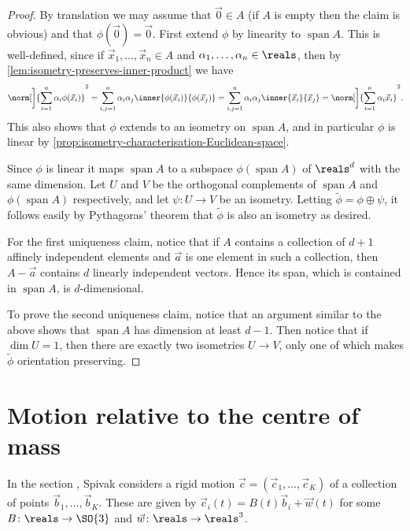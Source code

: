 \documentclass[article, a4paper, 11pt, oneside]{memoir}
\numberwithin{equation}{chapter}
\begin{document}
\newcommand{\Span}{\operatorname{span}}

\begin{proof}
    By translation we may assume that $\vec{0} \in A$ (if $A$ is empty then the claim is obvious) and that $\phi(\vec{0}) = \vec{0}$. First extend $\phi$ by linearity to $\Span A$. This is well-defined, since if $\vec{x}_1, \ldots, \vec{x}_n \in A$ and $\alpha_1, \ldots, \alpha_n \in \reals$, then by \cref{lem:isometry-preserves-inner-product} we have
    \begin{equation*}
        \norm[\bigg]{ \sum_{i=1}^n \alpha_i \phi(\vec{x}_i) }^2
            = \sum_{i,j=1}^n \alpha_i \alpha_j \inner{\phi(\vec{x}_i)}{\phi(\vec{x}_j)}
            = \sum_{i,j=1}^n \alpha_i \alpha_j \inner{\vec{x}_i}{\vec{x}_j}
            = \norm[\bigg]{ \sum_{i=1}^n \alpha_i \vec{x}_i }^2.
    \end{equation*}
    This also shows that $\phi$ extends to an isometry on $\Span A$, and in particular $\phi$ is linear by \cref{prop:isometry-characterisation-Euclidean-space}.

    Since $\phi$ is linear it maps $\Span A$ to a subspace $\phi(\Span A)$ of $\reals^d$ with the same dimension. Let $U$ and $V$ be the orthogonal complements of $\Span A$ and $\phi(\Span A)$ respectively, and let $\psi \colon U \to V$ be an isometry. Letting $\tilde{\phi} = \phi \oplus \psi$, it follows easily by Pythagoras' theorem that $\tilde{\phi}$ is also an isometry as desired.

    For the first uniqueness claim, notice that if $A$ contains a collection of $d+1$ affinely independent elements and $\vec{a}$ is one element in such a collection, then $A - \vec{a}$ contains $d$ linearly independent vectors. Hence its span, which is contained in $\Span A$, is $d$-dimensional.

    To prove the second uniqueness claim, notice that an argument similar to the above shows that $\Span A$ has dimension at least $d-1$. Then notice that if $\dim U = 1$, then there are exactly two isometries $U \to V$, only one of which makes $\tilde{\phi}$ orientation preserving.
\end{proof}


\section*{Motion relative to the centre of mass}

In the section , Spivak considers a rigid motion $\vec{c} = (\vec{c}_1, \ldots, \vec{c}_K)$ of a collection of points $\vec{b}_1, \ldots, \vec{b}_K$. These are given by $\vec{c}_i(t) = B(t) \vec{b}_i + \vec{w}(t)$ for some $B \colon \reals \to \SO{3}$ and $\vec{w} \colon \reals \to \reals^3$.
\end{document}
